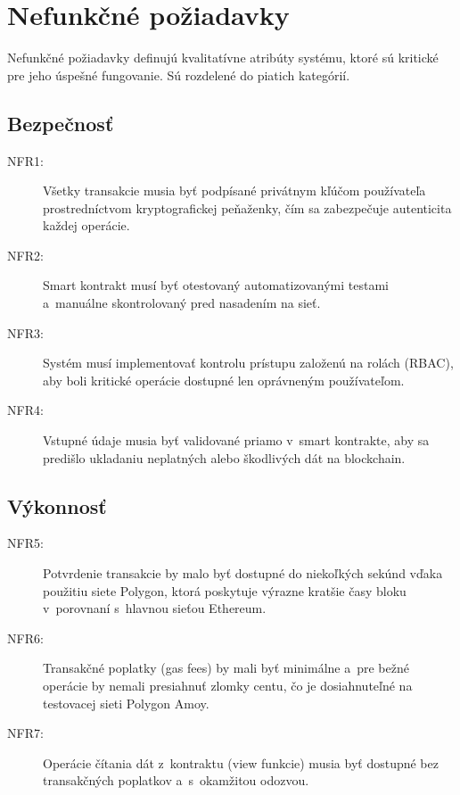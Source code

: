\section{Nefunkčné požiadavky}
\label{sec:nonfunctional_requirements}

Nefunkčné požiadavky definujú kvalitatívne atribúty systému, ktoré
sú kritické pre jeho úspešné fungovanie. Sú rozdelené do piatich
kategórií.

\subsection{Bezpečnosť}
\begin{description}
    \item[NFR1:] Všetky transakcie musia byť podpísané privátnym
    kľúčom používateľa prostredníctvom kryptografickej peňaženky,
    čím sa zabezpečuje autenticita každej operácie.

    \item[NFR2:] Smart kontrakt musí byť otestovaný automatizovanými
    testami a~manuálne skontrolovaný pred nasadením na sieť.

    \item[NFR3:] Systém musí implementovať kontrolu prístupu založenú
    na rolách (RBAC), aby boli kritické operácie dostupné len
    oprávneným používateľom.

    \item[NFR4:] Vstupné údaje musia byť validované priamo v~smart
    kontrakte, aby sa predišlo ukladaniu neplatných alebo škodlivých
    dát na blockchain.
\end{description}

\subsection{Výkonnosť}
\begin{description}
    \item[NFR5:] Potvrdenie transakcie by malo byť dostupné do
    niekoľkých sekúnd vďaka použitiu siete Polygon, ktorá poskytuje
    výrazne kratšie časy bloku v~porovnaní s~hlavnou sieťou Ethereum.

    \item[NFR6:] Transakčné poplatky (gas fees) by mali byť
    minimálne a~pre bežné operácie by nemali presiahnuť zlomky centu,
    čo je dosiahnuteľné na testovacej sieti Polygon Amoy.

    \item[NFR7:] Operácie čítania dát z~kontraktu (view funkcie) musia
    byť dostupné bez transakčných poplatkov a~s~okamžitou odozvou.
\end{description}

